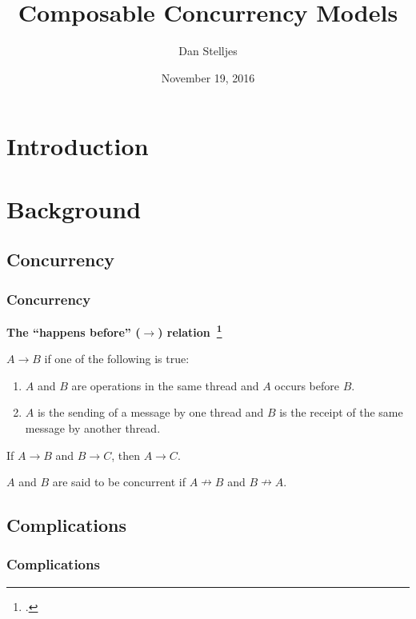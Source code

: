 \documentclass[aspectratio=1610]{beamer}
\title{Composable Concurrency Models}
\date{November 19, 2016}
\author{Dan Stelljes}
\begin{document}
  \maketitle

  \section{Introduction}

  \begin{frame}
    \centering
    \resizebox{0.8\linewidth}{!}{}
  \end{frame}

  \section{Background}

  \subsection{Concurrency}

  \begin{frame}
    \frametitle{Concurrency}

    \textbf{The ``happens before'' ($\rightarrow$) relation~\footcite{Lamport1977}}

    $A \rightarrow B$ if one of the following is true:

    \begin{enumerate}
      \item $A$ and $B$ are operations in the same thread and $A$ occurs before $B$.
      \item $A$ is the sending of a message by one thread and $B$ is the receipt of the same message by another thread.
    \end{enumerate}

    If $A \rightarrow B$ and $B \rightarrow C$, then $A \rightarrow C$.

    $A$ and $B$ are said to be concurrent if $A \nrightarrow B$ and $B \nrightarrow A$.
  \end{frame}

  \subsection{Complications}

  \begin{frame}
    \frametitle{Complications}

    \begin{itemize}

      \vfill

    \end{itemize}
  \end{frame}
\end{document}
